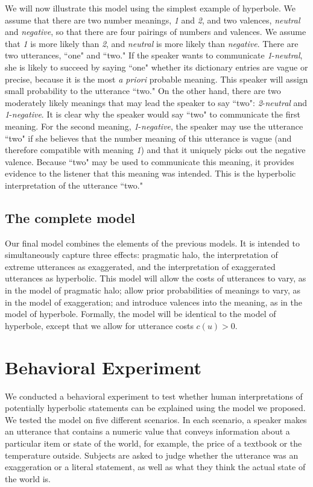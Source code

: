 \documentclass{article} %
\begin{document}
We will now illustrate this model using the simplest example of hyperbole. We assume that there are two number meanings, \emph{1} and \emph{2}, and two valences, \emph{neutral} and \emph{negative}, so that there are four pairings of numbers and valences. We assume that \emph{1} is more likely than \emph{2}, and \emph{neutral} is more likely than \emph{negative}. There are two utterances, ``one" and ``two." If the speaker wants to communicate \emph{1}-\emph{neutral}, she is likely to succeed by saying ``one" whether its dictionary entries are vague or precise, because it is the most \emph{a priori} probable meaning. This speaker will assign small probability to the utterance ``two." On the other hand, there are two moderately likely meanings that may lead the speaker to say ``two": \emph{2}-\emph{neutral} and \emph{1}-\emph{negative}. It is clear why the speaker would say ``two" to communicate the first meaning. For the second meaning, \emph{1}-\emph{negative}, the speaker may use the utterance ``two" if she believes that the number meaning of this utterance is vague (and therefore compatible with meaning \emph{1}) and that it uniquely picks out the negative valence. Because ``two" may be used to communicate this meaning, it provides evidence to the listener that this meaning was intended. This is the hyperbolic interpretation of the utterance ``two." 

\subsection{The complete model}

Our final model combines the elements of the previous models. It is intended to simultaneously capture three effects: pragmatic halo, the interpretation of extreme utterances as exaggerated, and the interpretation of exaggerated utterances as hyperbolic. This model will allow the costs of utterances to vary, as in the model of pragmatic halo; allow prior probabilities of meanings to vary, as in the model of exaggeration; and introduce valences into the meaning, as in the model of hyperbole. Formally, the model will be identical to the model of hyperbole, except that we allow for utterance costs $c(u) > 0$. 

\section{Behavioral Experiment}

We conducted a behavioral experiment to test whether human interpretations of potentially hyperbolic statements can be explained using the model we proposed. We tested the model on five different scenarios. In each scenario, a speaker makes an utterance that contains a numeric value that conveys information about a particular item or state of the world, for example, the price of a textbook or the temperature outside. Subjects are asked to judge whether the utterance was an exaggeration or a literal statement, as well as what they think the actual state of the world is. 
\end{document}
